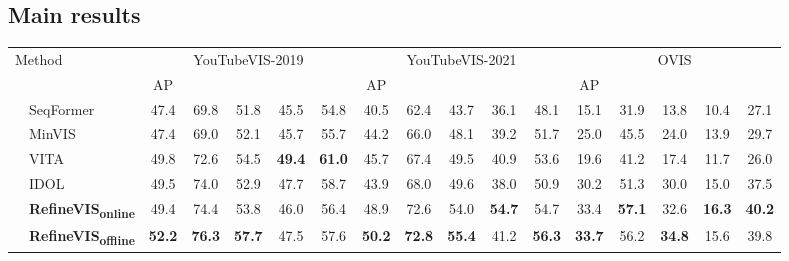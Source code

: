 \subsection{Main results}

\begin{table*}[t]
	\small
	\centering
	\footnotesize
    \setlength{\tabcolsep}{5pt}
	\begin{tabular}{l|l|ccccc|ccccc|ccccc}
		\toprule
		\multicolumn{2}{l|}{\multirow{2}{*}{Method}} & \multicolumn{5}{c|}{YouTubeVIS-2019} & \multicolumn{5}{c|}{YouTubeVIS-2021} & \multicolumn{5}{c}{OVIS} \\
		\multicolumn{2}{l|}{} & AP &  &  &  &  & AP &  &  &  &  & AP &  &  &  & \\
		\midrule
		\parbox[t]{2mm}{}
& SeqFormer~\cite{wu2021seqformer} & 47.4 & 69.8 & 51.8 & 45.5 & 54.8 & 40.5 & 62.4 & 43.7  & 36.1 & 48.1 & 15.1 & 31.9 & 13.8 & 10.4 & 27.1 \\
		& MinVIS~\cite{huang2022minvis} & 47.4 & 69.0 & 52.1 & 45.7 & 55.7 & 44.2 & 66.0 & 48.1 & 39.2 & 51.7 & 25.0 & 45.5 & 24.0 & 13.9 & 29.7 \\
		& VITA~\cite{heo2022vita} & 49.8 & 72.6 & 54.5 & \textbf{49.4} & \textbf{61.0} & 45.7 & 67.4 & 49.5 & 40.9 & 53.6 & 19.6 & 41.2 & 17.4 & 11.7 & 26.0 \\
		& IDOL~\cite{IDOL} & 49.5 & 74.0 & 52.9 & 47.7 & 58.7 & 43.9 & 68.0 & 49.6 & 38.0 & 50.9 & 30.2 & 51.3  & 30.0  &15.0 & 37.5 \\
& \textbf{RefineVIS\textsubscript{online}} & 49.4 & 74.4 & 53.8 & 46.0 & 56.4 & 48.9 & 72.6 & 54.0 & \textbf{54.7} & 54.7 & 33.4 & \textbf{57.1} & 32.6 & \textbf{16.3} & \textbf{40.2} \\
		& \textbf{RefineVIS\textsubscript{offline}} & \textbf{52.2} & \textbf{76.3} & \textbf{57.7} & 47.5 & 57.6 & \textbf{50.2} & \textbf{72.8} & \textbf{55.4} & 41.2 & \textbf{56.3} & \textbf{33.7} & 56.2 & \textbf{34.8} & 15.6 & 39.8 \\
		

\end{tabular}
\end{table*}
